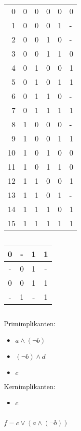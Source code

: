 \documentclass{article}
\begin{document}
\section{}
\begin{tabular}{r|cccc|l}
    0&0&0&0&0&0\\
    1&0&0&0&1&-\\
    2&0&0&1&0&-\\
    3&0&0&1&1&0\\
    4&0&1&0&0&1\\
    5&0&1&0&1&1\\
    6&0&1&1&0&-\\
    7&0&1&1&1&1\\
    8&1&0&0&0&-\\
    9&1&0&0&1&1\\
    10&1&0&1&0&0\\
    11&1&0&1&1&0\\
    12&1&1&0&0&1\\
    13&1&1&0&1&-\\
    14&1&1&1&0&1\\
    15&1&1&1&1&1\\
\end{tabular}
\subsection{}
\begin{tabular}{c|c|c|c}
    0&-&1&1\\
    \hline
    -&0&1&-\\
    \hline
    0&0&1&1\\
    \hline
    -&1&-&1\\
\end{tabular}
\subsection{}
Primimplikanten:
\begin{itemize}
    \item{$a\land(\neg b)$}
    \item $(\neg b)\land d$
    \item $c$
\end{itemize}
Kernimplikanten:
\begin{itemize}
    \item $c$
\end{itemize}
\subsection{}
$f=c\lor (a \land (\neg b))$
\end{document}
